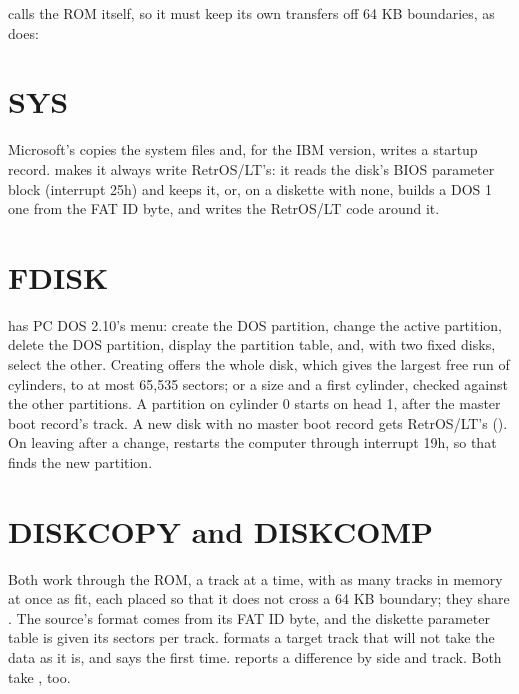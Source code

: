  calls the ROM itself, so it must keep its own transfers off
64 KB boundaries, as  does:



\section{SYS}

Microsoft's  copies the system files and, for the IBM version,
writes a startup record.  makes it always write RetrOS/LT's:
it reads the disk's BIOS parameter block (interrupt 25h) and keeps it, or,
on a diskette with none, builds a DOS 1 one from the FAT ID byte, and
writes the RetrOS/LT code around it.

\section{FDISK}

 has PC DOS 2.10's menu: create the DOS partition, change the
active partition, delete the DOS partition, display the partition table,
and, with two fixed disks, select the other. Creating offers the whole
disk, which gives the largest free run of cylinders, to at most 65,535
sectors; or a size and a first cylinder, checked against the other
partitions. A partition on cylinder 0 starts on head 1, after the master
boot record's track. A new disk with no master boot record gets RetrOS/LT's
(). On leaving after a change,  restarts the
computer through interrupt 19h, so that  finds the new
partition.

\section{DISKCOPY and DISKCOMP}

Both work through the ROM, a track at a time, with as many tracks in
memory at once as fit, each placed so that it does not cross a 64 KB
boundary; they share . The source's format comes from
its FAT ID byte, and the diskette parameter table is given its sectors per
track.  formats a target track that will not take the data
as it is, and says  the first time.
 reports a difference by side and track. Both take
,   too.

